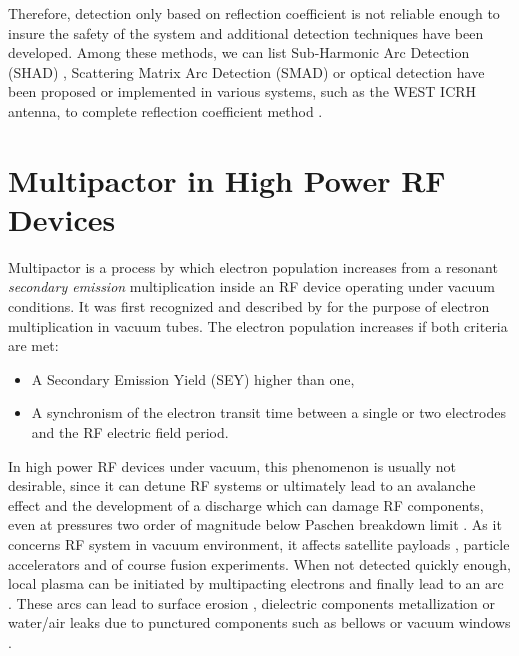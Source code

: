 Therefore, detection only based on reflection coefficient is not reliable enough to insure the safety of the system and additional detection techniques have been developed. Among these methods, we can list Sub-Harmonic Arc Detection (SHAD) , Scattering Matrix Arc Detection (SMAD)  or optical detection have been proposed or implemented in various systems, such as the WEST ICRH antenna, to complete reflection coefficient method . 



\section[Multipactor]{Multipactor in High Power RF Devices}
Multipactor is a process by which electron population increases from a resonant \textit{secondary emission} multiplication inside an RF device operating under vacuum conditions. It was first recognized and described by  for the purpose of electron multiplication in vacuum tubes. The electron population increases if both criteria are met: 
\begin{itemize}
	\item A Secondary Emission Yield (SEY) higher than one,
	\item A synchronism of the electron transit time between a single or two electrodes and the RF electric field period.
\end{itemize}

In high power RF devices under vacuum, this phenomenon is usually not desirable, since it can detune RF systems or ultimately lead to an avalanche effect and the development of a discharge which can damage RF components, even at pressures two order of magnitude below Paschen breakdown limit . As it concerns RF system in vacuum environment, it affects satellite payloads , particle accelerators  and of course fusion experiments. When not detected quickly enough, local plasma can be initiated by multipacting electrons and finally lead to an arc . These arcs can lead to surface erosion , dielectric components metallization  or water/air leaks due to punctured components such as bellows or vacuum windows . 

